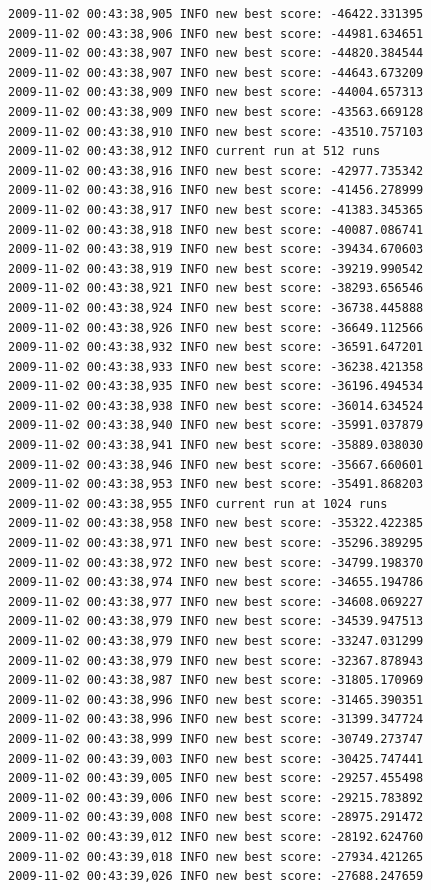 \documentclass[12pt]{article}
\begin{document}
\begin{verbatim}
2009-11-02 00:43:38,905 INFO new best score: -46422.331395
2009-11-02 00:43:38,906 INFO new best score: -44981.634651
2009-11-02 00:43:38,907 INFO new best score: -44820.384544
2009-11-02 00:43:38,907 INFO new best score: -44643.673209
2009-11-02 00:43:38,909 INFO new best score: -44004.657313
2009-11-02 00:43:38,909 INFO new best score: -43563.669128
2009-11-02 00:43:38,910 INFO new best score: -43510.757103
2009-11-02 00:43:38,912 INFO current run at 512 runs
2009-11-02 00:43:38,916 INFO new best score: -42977.735342
2009-11-02 00:43:38,916 INFO new best score: -41456.278999
2009-11-02 00:43:38,917 INFO new best score: -41383.345365
2009-11-02 00:43:38,918 INFO new best score: -40087.086741
2009-11-02 00:43:38,919 INFO new best score: -39434.670603
2009-11-02 00:43:38,919 INFO new best score: -39219.990542
2009-11-02 00:43:38,921 INFO new best score: -38293.656546
2009-11-02 00:43:38,924 INFO new best score: -36738.445888
2009-11-02 00:43:38,926 INFO new best score: -36649.112566
2009-11-02 00:43:38,932 INFO new best score: -36591.647201
2009-11-02 00:43:38,933 INFO new best score: -36238.421358
2009-11-02 00:43:38,935 INFO new best score: -36196.494534
2009-11-02 00:43:38,938 INFO new best score: -36014.634524
2009-11-02 00:43:38,940 INFO new best score: -35991.037879
2009-11-02 00:43:38,941 INFO new best score: -35889.038030
2009-11-02 00:43:38,946 INFO new best score: -35667.660601
2009-11-02 00:43:38,953 INFO new best score: -35491.868203
2009-11-02 00:43:38,955 INFO current run at 1024 runs
2009-11-02 00:43:38,958 INFO new best score: -35322.422385
2009-11-02 00:43:38,971 INFO new best score: -35296.389295
2009-11-02 00:43:38,972 INFO new best score: -34799.198370
2009-11-02 00:43:38,974 INFO new best score: -34655.194786
2009-11-02 00:43:38,977 INFO new best score: -34608.069227
2009-11-02 00:43:38,979 INFO new best score: -34539.947513
2009-11-02 00:43:38,979 INFO new best score: -33247.031299
2009-11-02 00:43:38,979 INFO new best score: -32367.878943
2009-11-02 00:43:38,987 INFO new best score: -31805.170969
2009-11-02 00:43:38,996 INFO new best score: -31465.390351
2009-11-02 00:43:38,996 INFO new best score: -31399.347724
2009-11-02 00:43:38,999 INFO new best score: -30749.273747
2009-11-02 00:43:39,003 INFO new best score: -30425.747441
2009-11-02 00:43:39,005 INFO new best score: -29257.455498
2009-11-02 00:43:39,006 INFO new best score: -29215.783892
2009-11-02 00:43:39,008 INFO new best score: -28975.291472
2009-11-02 00:43:39,012 INFO new best score: -28192.624760
2009-11-02 00:43:39,018 INFO new best score: -27934.421265
2009-11-02 00:43:39,026 INFO new best score: -27688.247659

\end{verbatim}
\end{document}
